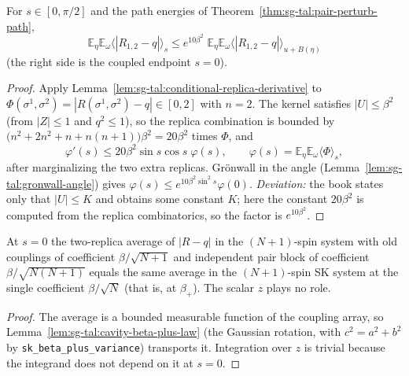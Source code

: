\begin{theorem}
\label{thm:sg-tal:pair-perturb-gronwall}
  \leanok
{}
For $s\in[0,\pi/2]$ and the path energies of Theorem~\ref{thm:sg-tal:pair-perturb-path},
\[
 \mathbb E_\eta\mathbb E_\omega\bigl\langle|R_{1,2}-q|\bigr\rangle_s\le
 e^{10\beta^2}\;\mathbb E_\eta\mathbb E_\omega\bigl\langle|R_{1,2}-q|\bigr\rangle_{u+B(\eta)}
\]
(the right side is the coupled endpoint $s=0$).
\end{theorem}
\begin{proof}
  \leanok
Apply Lemma~\ref{lem:sg-tal:conditional-replica-derivative} to $\Phi(\sigma^1,\sigma^2)=|R(\sigma^1,\sigma^2)-q|\in[0,2]$
with $n=2$.  The kernel satisfies $|U|\le\beta^2$ (from $|Z|\le1$ and $q^2\le1$), so the replica combination is bounded
by $\bigl(n^2+2n^2+n+n(n+1)\bigr)\beta^2=20\beta^2$ times $\Phi$, and
\[
 \varphi'(s)\le20\beta^2\sin s\cos s\;\varphi(s),\qquad\varphi(s)=\mathbb E_\eta\mathbb E_\omega\langle\Phi\rangle_s ,
\]
after marginalizing the two extra replicas.  Gr\"onwall in the angle
(Lemma~\ref{lem:sg-tal:gronwall-angle}) gives $\varphi(s)\le e^{10\beta^2\sin^2s}\varphi(0)$.
\emph{Deviation:} the book states only that $|U|\le K$ and obtains some constant $K$; here the
constant $20\beta^2$ is computed from the replica combinatorics, so the factor is $e^{10\beta^2}$.
\end{proof}

\begin{lemma}
\label{lem:sg-tal:pair-perturb-endpoint}
  \leanok
{}
At $s=0$ the two-replica average of $|R-q|$ in the $(N+1)$-spin system with old couplings of
coefficient $\beta/\sqrt{N+1}$ and independent pair block of coefficient $\beta/\sqrt{N(N+1)}$ equals the
same average in the $(N+1)$-spin SK system at the single coefficient $\beta/\sqrt N$ (that is, at
$\beta_+$).  The scalar $z$ plays no role.
\end{lemma}
\begin{proof}
  \leanok
The average is a bounded measurable function of the coupling array, so Lemma~\ref{lem:sg-tal:cavity-beta-plus-law}
(the Gaussian rotation, with $c^2=a^2+b^2$ by \texttt{sk\_beta\_plus\_variance}) transports it.
Integration over $z$ is trivial because the integrand does not depend on it at $s=0$.
\end{proof}

